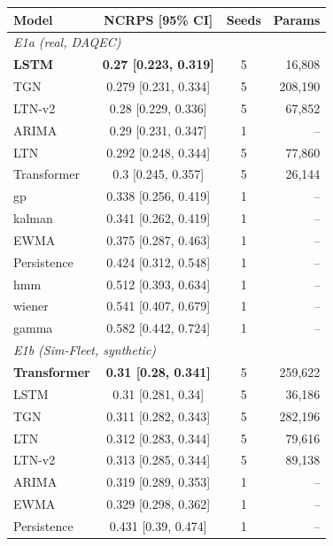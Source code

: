 \begin{tabular}{lccr}
\toprule
Model & NCRPS [95\% CI] & Seeds & Params \\
\midrule
\multicolumn{4}{l}{\emph{E1a (real, DAQEC)}} \\
\textbf{LSTM} & \textbf{0.27 [0.223, 0.319]} & 5 & 16,808 \\
TGN & 0.279 [0.231, 0.334] & 5 & 208,190 \\
LTN-v2 & 0.28 [0.229, 0.336] & 5 & 67,852 \\
ARIMA & 0.29 [0.231, 0.347] & 1 & -- \\
LTN & 0.292 [0.248, 0.344] & 5 & 77,860 \\
Transformer & 0.3 [0.245, 0.357] & 5 & 26,144 \\
gp & 0.338 [0.256, 0.419] & 1 & -- \\
kalman & 0.341 [0.262, 0.419] & 1 & -- \\
EWMA & 0.375 [0.287, 0.463] & 1 & -- \\
Persistence & 0.424 [0.312, 0.548] & 1 & -- \\
hmm & 0.512 [0.393, 0.634] & 1 & -- \\
wiener & 0.541 [0.407, 0.679] & 1 & -- \\
gamma & 0.582 [0.442, 0.724] & 1 & -- \\
\midrule
\multicolumn{4}{l}{\emph{E1b (Sim-Fleet, synthetic)}} \\
\textbf{Transformer} & \textbf{0.31 [0.28, 0.341]} & 5 & 259,622 \\
LSTM & 0.31 [0.281, 0.34] & 5 & 36,186 \\
TGN & 0.311 [0.282, 0.343] & 5 & 282,196 \\
LTN & 0.312 [0.283, 0.344] & 5 & 79,616 \\
LTN-v2 & 0.313 [0.285, 0.344] & 5 & 89,138 \\
ARIMA & 0.319 [0.289, 0.353] & 1 & -- \\
EWMA & 0.329 [0.298, 0.362] & 1 & -- \\
Persistence & 0.431 [0.39, 0.474] & 1 & -- \\
\bottomrule
\end{tabular}

